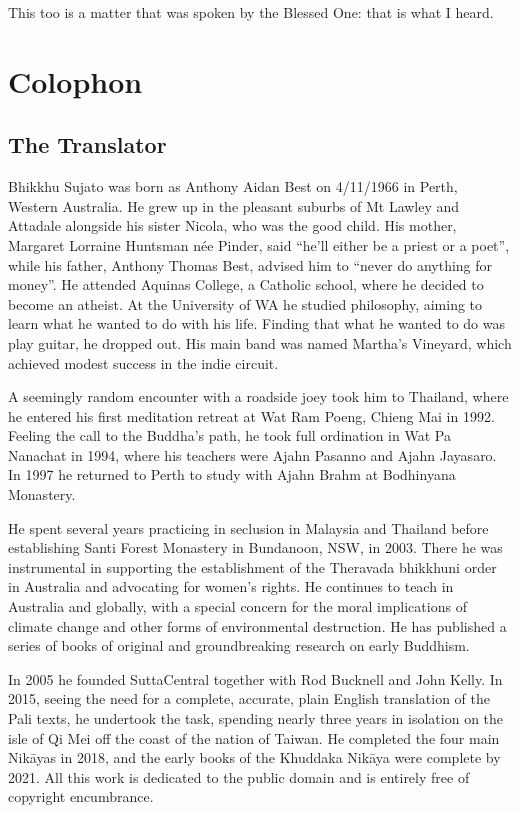 \documentclass[12pt,openany]{book}%
\let\oldbackmatter\backmatter
\renewcommand{\backmatter}{%
\chapterfont{\setstretch{.85}\normalfont\centering}%
\sectionfont{\setstretch{.85}\Semiboldsubheadfont}%
\oldbackmatter}
\begin{document}
This too is a matter that was spoken by the Blessed One: that is what I heard. 

%
\backmatter%
\chapter*{Colophon}

\section*{The Translator}

Bhikkhu Sujato was born as Anthony Aidan Best on 4/11/1966 in Perth, Western Australia. He grew up in the pleasant suburbs of Mt Lawley and Attadale alongside his sister Nicola, who was the good child. His mother, Margaret Lorraine Huntsman née Pinder, said “he’ll either be a priest or a poet”, while his father, Anthony Thomas Best, advised him to “never do anything for money”. He attended Aquinas College, a Catholic school, where he decided to become an atheist. At the University of WA he studied philosophy, aiming to learn what he wanted to do with his life. Finding that what he wanted to do was play guitar, he dropped out. His main band was named Martha’s Vineyard, which achieved modest success in the indie circuit. 

A seemingly random encounter with a roadside joey took him to Thailand, where he entered his first meditation retreat at Wat Ram Poeng, Chieng Mai in 1992. Feeling the call to the Buddha’s path, he took full ordination in Wat Pa Nanachat in 1994, where his teachers were Ajahn Pasanno and Ajahn Jayasaro. In 1997 he returned to Perth to study with Ajahn Brahm at Bodhinyana Monastery. 

He spent several years practicing in seclusion in Malaysia and Thailand before establishing Santi Forest Monastery in Bundanoon, NSW, in 2003. There he was instrumental in supporting the establishment of the Theravada bhikkhuni order in Australia and advocating for women’s rights. He continues to teach in Australia and globally, with a special concern for the moral implications of climate change and other forms of environmental destruction. He has published a series of books of original and groundbreaking research on early Buddhism. 

In 2005 he founded SuttaCentral together with Rod Bucknell and John Kelly. In 2015, seeing the need for a complete, accurate, plain English translation of the Pali texts, he undertook the task, spending nearly three years in isolation on the isle of Qi Mei off the coast of the nation of Taiwan. He completed the four main \textsanskrit{Nikāyas} in 2018, and the early books of the Khuddaka \textsanskrit{Nikāya} were complete by 2021. All this work is dedicated to the public domain and is entirely free of copyright encumbrance. 
\end{document}
